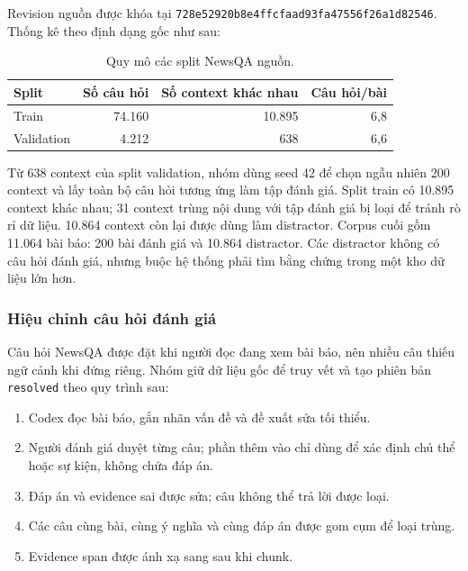 Revision nguồn được khóa tại
\texttt{728e52920b8e4ffcfaad93fa47556f26a1d82546}. Thống kê theo định dạng gốc
như sau:

\begin{table}[htbp]
  \centering
  \caption{Quy mô các split NewsQA nguồn.}
  \label{tab:newsqa-source-splits}
  \begin{tabular}{@{}lrrr@{}}
    \toprule
    \textbf{Split} & \textbf{Số câu hỏi} & \textbf{Số context khác nhau}
    & \textbf{Câu hỏi/bài} \\
    \midrule
    Train & 74.160 & 10.895 & 6,8 \\
    Validation & 4.212 & 638 & 6,6 \\
    \bottomrule
  \end{tabular}
\end{table}

Từ 638 context của split validation, nhóm dùng seed 42 để chọn ngẫu nhiên 200
context và lấy toàn bộ câu hỏi tương ứng làm tập đánh giá. Split train có
10.895 context khác nhau; 31 context trùng nội dung với tập đánh giá bị loại để
tránh rò rỉ dữ liệu. 10.864 context còn lại được dùng làm distractor. Corpus
cuối gồm 11.064 bài báo: 200 bài đánh giá và 10.864 distractor. Các distractor
không có câu hỏi đánh giá, nhưng buộc hệ thống phải tìm bằng chứng trong một kho
dữ liệu lớn hơn.

\subsubsection{Hiệu chỉnh câu hỏi đánh giá}

Câu hỏi NewsQA được đặt khi người đọc đang xem bài báo, nên nhiều câu thiếu ngữ
cảnh khi đứng riêng. Nhóm giữ dữ liệu gốc để truy vết và tạo phiên bản
\texttt{resolved} theo quy trình sau:

\begin{enumerate}
  \item Codex đọc bài báo, gắn nhãn vấn đề và đề xuất sửa tối thiểu.
  \item Người đánh giá duyệt từng câu; phần thêm vào chỉ dùng để xác định chủ
  thể hoặc sự kiện, không chứa đáp án.
  \item Đáp án và evidence sai được sửa; câu không thể trả lời được loại.
  \item Các câu cùng bài, cùng ý nghĩa và cùng đáp án được gom cụm để loại trùng.
  \item Evidence span được ánh xạ sang  sau khi chunk.
\end{enumerate}

